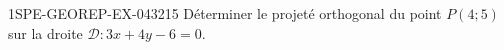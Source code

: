 \begin{exercice}{1SPE-GEOREP-EX-043}{2}{15}
Déterminer le projeté orthogonal du point $P(4 ; 5)$ sur la droite $\mathcal{D} : 3x + 4y - 6 = 0$.
\end{exercice}
